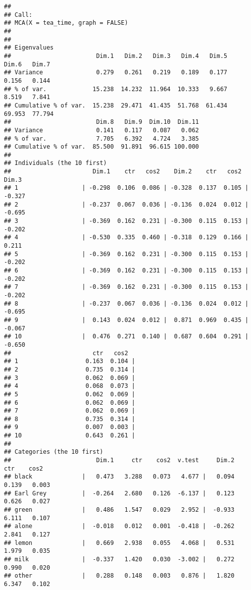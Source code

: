 \documentclass[]{article}
\begin{document}
\begin{verbatim}
## 
## Call:
## MCA(X = tea_time, graph = FALSE) 
## 
## 
## Eigenvalues
##                        Dim.1   Dim.2   Dim.3   Dim.4   Dim.5   Dim.6   Dim.7
## Variance               0.279   0.261   0.219   0.189   0.177   0.156   0.144
## % of var.             15.238  14.232  11.964  10.333   9.667   8.519   7.841
## Cumulative % of var.  15.238  29.471  41.435  51.768  61.434  69.953  77.794
##                        Dim.8   Dim.9  Dim.10  Dim.11
## Variance               0.141   0.117   0.087   0.062
## % of var.              7.705   6.392   4.724   3.385
## Cumulative % of var.  85.500  91.891  96.615 100.000
## 
## Individuals (the 10 first)
##                       Dim.1    ctr   cos2    Dim.2    ctr   cos2    Dim.3
## 1                  | -0.298  0.106  0.086 | -0.328  0.137  0.105 | -0.327
## 2                  | -0.237  0.067  0.036 | -0.136  0.024  0.012 | -0.695
## 3                  | -0.369  0.162  0.231 | -0.300  0.115  0.153 | -0.202
## 4                  | -0.530  0.335  0.460 | -0.318  0.129  0.166 |  0.211
## 5                  | -0.369  0.162  0.231 | -0.300  0.115  0.153 | -0.202
## 6                  | -0.369  0.162  0.231 | -0.300  0.115  0.153 | -0.202
## 7                  | -0.369  0.162  0.231 | -0.300  0.115  0.153 | -0.202
## 8                  | -0.237  0.067  0.036 | -0.136  0.024  0.012 | -0.695
## 9                  |  0.143  0.024  0.012 |  0.871  0.969  0.435 | -0.067
## 10                 |  0.476  0.271  0.140 |  0.687  0.604  0.291 | -0.650
##                       ctr   cos2  
## 1                   0.163  0.104 |
## 2                   0.735  0.314 |
## 3                   0.062  0.069 |
## 4                   0.068  0.073 |
## 5                   0.062  0.069 |
## 6                   0.062  0.069 |
## 7                   0.062  0.069 |
## 8                   0.735  0.314 |
## 9                   0.007  0.003 |
## 10                  0.643  0.261 |
## 
## Categories (the 10 first)
##                        Dim.1     ctr    cos2  v.test     Dim.2     ctr    cos2
## black              |   0.473   3.288   0.073   4.677 |   0.094   0.139   0.003
## Earl Grey          |  -0.264   2.680   0.126  -6.137 |   0.123   0.626   0.027
## green              |   0.486   1.547   0.029   2.952 |  -0.933   6.111   0.107
## alone              |  -0.018   0.012   0.001  -0.418 |  -0.262   2.841   0.127
## lemon              |   0.669   2.938   0.055   4.068 |   0.531   1.979   0.035
## milk               |  -0.337   1.420   0.030  -3.002 |   0.272   0.990   0.020
## other              |   0.288   0.148   0.003   0.876 |   1.820   6.347   0.102

\end{verbatim}
\end{document}
